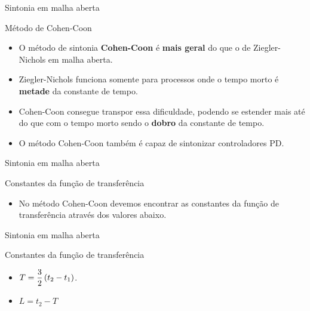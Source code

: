 \begin{frame}{Sintonia em malha aberta}
	\begin{block}{Método de Cohen-Coon}
		\begin{itemize}
			\item O método de sintonia \textbf{Cohen-Coon} é \textbf{mais geral} do que o de Ziegler-Nichols em malha aberta.
			\item Ziegler-Nichols funciona somente para processos onde o tempo morto é \textbf{metade} da constante de tempo.
			\item Cohen-Coon consegue transpor essa dificuldade, podendo se estender mais até do que com o tempo morto sendo o \textbf{dobro} da constante de tempo.
			\item O método Cohen-Coon também é capaz de sintonizar controladores PD.
		\end{itemize}
	\end{block}
\end{frame}


\begin{frame}{Sintonia em malha aberta}
	\begin{block}{Constantes da função de transferência}
		\begin{itemize}
			\item No método Cohen-Coon devemos encontrar as constantes da função de transferência através dos valores abaixo.
		\end{itemize}
	\end{block}
	
	\centering
	\scalebox{1.5}{}
	
\end{frame}


\begin{frame}{Sintonia em malha aberta}
	\begin{block}{Constantes da função de transferência}
		\begin{itemize}
			\item $ T=\dfrac{3}{2}\del{t_2-t_1} $.
			\item $ L=t_2-T $
		\end{itemize}
	\end{block}
	
	\centering
	\scalebox{1.4}{}
\end{frame}


